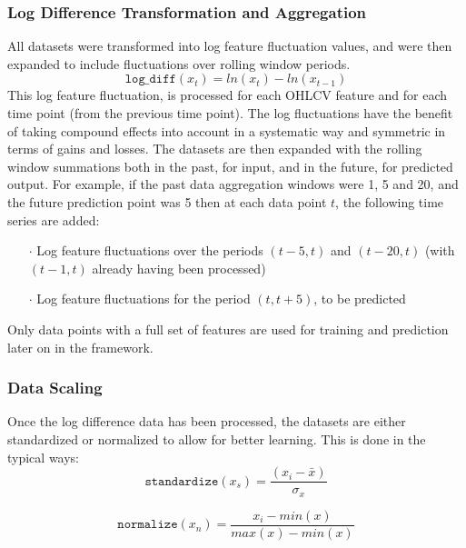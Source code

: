 \documentclass[a4paper,11pt,oneside]{article}
\theoremstyle{plain}
\theoremstyle{definition}
\begin{document}
\subsubsection{Log Difference Transformation and Aggregation}\label{ldata_og_difference}
All datasets were transformed into log feature fluctuation values, and were then expanded to include fluctuations over rolling window periods.
\begin{equation}
\texttt{log\_diff}(x_t) = ln(x_t) - ln(x_{t-1})
\end{equation}
This log feature fluctuation,  is processed for each OHLCV feature and for each time point (from the previous time point). The log fluctuations have the benefit of taking compound effects into account in a systematic way and symmetric in terms of gains and losses.
\newline\newline
The datasets are then expanded with the rolling window summations both in the past, for input, and in the future, for predicted output. For example, if the past data aggregation windows were 1, 5 and 20, and the future prediction point was 5 then at each data point $t$, the following time series are added:
\begin{itemize}
	\item [$\cdot$] Log feature fluctuations over the periods $(t-5, t)$ and $(t-20, t)$ (with $(t-1, t)$ already having been processed)
	\item [$\cdot$] Log feature fluctuations for the period $(t, t + 5)$, to be predicted
\end{itemize}

Only data points with a full set of features are used for training and prediction later on in the framework.

\subsubsection{Data Scaling}\label{data_scaling}
Once the log difference data has been processed, the datasets are either standardized or normalized to allow for better learning. This is done in the typical ways:
\begin{equation}
\texttt{standardize}(x_s) = \frac{(x_i - \bar{x}) }{\sigma_x}
\end{equation}

\begin{equation}
\texttt{normalize}(x_n) = \frac{x_i - min(x) }{max(x) - min(x)}
\end{equation}
\end{document}
